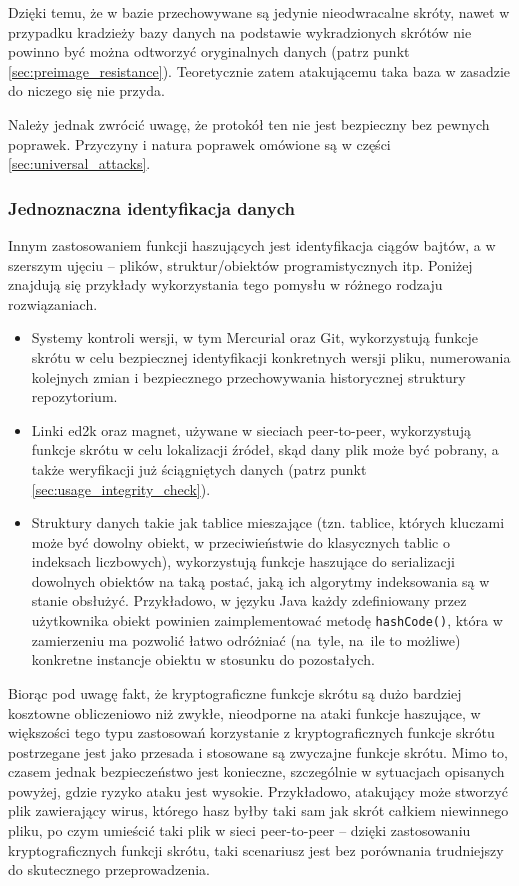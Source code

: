 \documentclass[12pt,a4paper,twoside]{article}
\begin{document}
Dzięki temu, że w bazie przechowywane są jedynie nieodwracalne skróty, nawet w
przypadku kradzieży bazy danych na podstawie wykradzionych skrótów nie powinno
być można odtworzyć oryginalnych danych (patrz punkt
\ref{sec:preimage_resistance}). Teoretycznie zatem atakującemu taka baza w
zasadzie do niczego się nie przyda.

Należy jednak zwrócić uwagę, że protokół ten nie jest bezpieczny bez pewnych
poprawek. Przyczyny i natura poprawek omówione są w części
\ref{sec:universal_attacks}.

\subsubsection{Jednoznaczna identyfikacja danych}

Innym zastosowaniem funkcji haszujących jest identyfikacja ciągów bajtów, a w
szerszym ujęciu -- plików, struktur/obiektów programistycznych itp. Poniżej
znajdują się przykłady wykorzystania tego pomysłu w różnego rodzaju
rozwiązaniach.
\begin{itemize}
\item Systemy kontroli wersji, w tym Mercurial oraz Git, wykorzystują funkcje
skrótu w celu bezpiecznej identyfikacji konkretnych wersji pliku, numerowania
kolejnych zmian i bezpiecznego przechowywania historycznej struktury
repozytorium.
\item Linki ed2k oraz magnet, używane w sieciach peer-to-peer, wykorzystują
funkcje skrótu w celu lokalizacji źródeł, skąd dany plik może być pobrany, a
także weryfikacji już ściągniętych danych (patrz punkt
\ref{sec:usage_integrity_check}).
\item Struktury danych takie jak tablice mieszające (tzn. tablice, których
kluczami może być dowolny obiekt, w przeciwieństwie do klasycznych tablic o
indeksach liczbowych), wykorzystują funkcje haszujące do serializacji dowolnych
obiektów na taką postać, jaką ich algorytmy indeksowania są w stanie obsłużyć.
Przykładowo, w języku Java każdy zdefiniowany przez użytkownika obiekt powinien
zaimplementować metodę \texttt{hashCode()}, która w zamierzeniu ma pozwolić
łatwo odróżniać (na~tyle, na~ile to możliwe) konkretne instancje obiektu w
stosunku do pozostałych.
\end{itemize}

Biorąc pod uwagę fakt, że kryptograficzne funkcje skrótu są dużo bardziej
kosztowne obliczeniowo niż zwykłe, nieodporne na ataki funkcje haszujące, w
większości tego typu zastosowań korzystanie z kryptograficznych funkcje skrótu
postrzegane jest jako przesada i stosowane są zwyczajne funkcje skrótu. Mimo
to, czasem jednak bezpieczeństwo jest konieczne, szczególnie w sytuacjach
opisanych powyżej, gdzie ryzyko ataku jest wysokie. Przykładowo, atakujący może
stworzyć plik zawierający wirus, którego hasz byłby taki sam jak skrót całkiem
niewinnego pliku, po czym umieścić taki plik w sieci peer-to-peer -- dzięki
zastosowaniu kryptograficznych funkcji skrótu, taki scenariusz jest bez
porównania trudniejszy do skutecznego przeprowadzenia.
\end{document}
